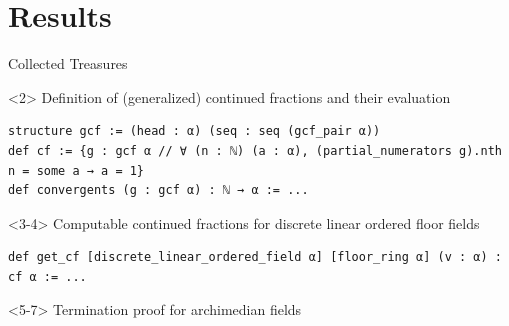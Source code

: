 \documentclass{beamer}
\begin{document}
\section{Results}
\begin{frame}[fragile]{Collected Treasures}
\begin{onlyenv}<2>
Definition of (generalized) continued fractions and their evaluation
\begin{verbatim}
structure gcf := (head : α) (seq : seq (gcf_pair α))
def cf := {g : gcf α // ∀ (n : ℕ) (a : α), (partial_numerators g).nth n = some a → a = 1}
def convergents (g : gcf α) : ℕ → α := ...
\end{verbatim}
\end{onlyenv}
\begin{onlyenv}<3-4>
Computable continued fractions for discrete linear ordered floor fields 
\begin{verbatim}
def get_cf [discrete_linear_ordered_field α] [floor_ring α] (v : α) : cf α := ...
\end{verbatim}
\end{onlyenv}
\begin{onlyenv}<5-7>
Termination proof for archimedian fields
\begin{verbatim}

\end{verbatim}
\end{onlyenv}
\end{frame}
\end{document}
